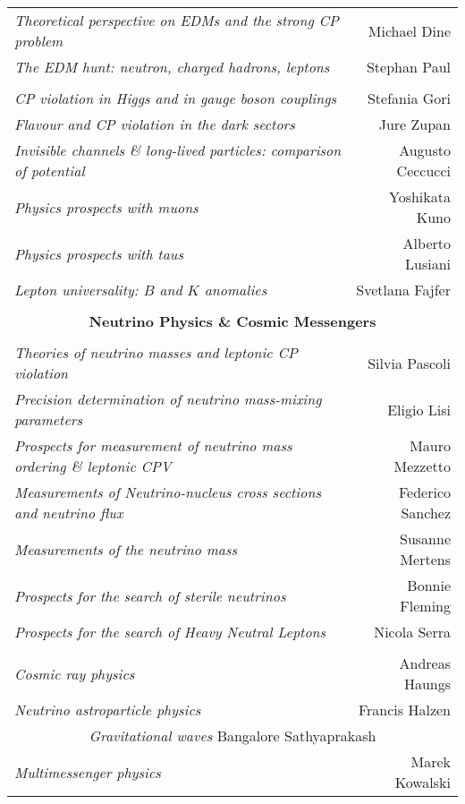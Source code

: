 \begin{flushleft}
\begin{tabular}{lr}
\it Theoretical perspective on EDMs and the strong CP problem & Michael Dine \\
\it The EDM hunt: neutron, charged hadrons, leptons  & Stephan Paul \\
\vspace*{-3mm} & \\
\it CP violation in Higgs and in gauge boson couplings & Stefania Gori \\
\it Flavour and CP violation in the dark sectors & Jure Zupan \\
\it Invisible channels \& long-lived particles: comparison of potential & Augusto Ceccucci \\
\it Physics prospects with muons & Yoshikata Kuno \\
\it Physics prospects with taus & Alberto Lusiani \\
\it Lepton universality: $B$ and $K$ anomalies & Svetlana Fajfer \\ \hline
\vspace*{-3mm} & \\
\multicolumn{2}{c}{\bf Neutrino Physics \& Cosmic Messengers} \\
\vspace*{-3mm} & \\
\it Theories of neutrino masses and leptonic CP violation & Silvia Pascoli \\
\it Precision determination of neutrino mass-mixing parameters & Eligio Lisi \\
\it Prospects for measurement of neutrino mass ordering \& leptonic CPV & Mauro Mezzetto \\
\it Measurements of Neutrino-nucleus cross sections and neutrino flux & Federico Sanchez \\
\it Measurements of the neutrino mass & Susanne Mertens \\
\it Prospects for the search of sterile neutrinos & Bonnie Fleming \\
\it Prospects for the search of Heavy Neutral Leptons & Nicola Serra \\
\vspace*{-3mm} & \\
\it Cosmic ray physics & Andreas Haungs \\
\it Neutrino astroparticle physics & Francis Halzen \\
\multicolumn{2}{c}{{\it Gravitational waves} \hfill Bangalore Sathyaprakash} \\
\it Multimessenger physics & Marek Kowalski \\ \hline

\end{tabular}
\end{flushleft}
